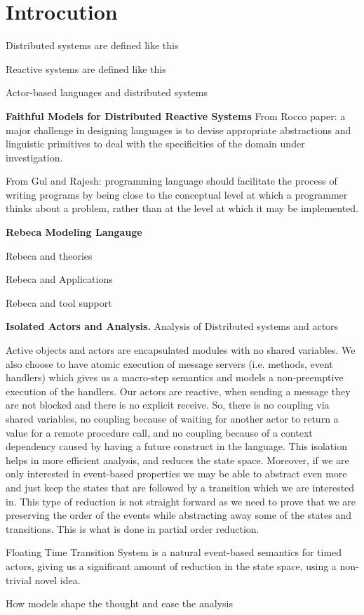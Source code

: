 \section{Introcution} \label{sec::introduction}



Distributed systems  are defined like this

Reactive systems are defined like this

Actor-based languages and distributed systems

\noindent\textbf{Faithful Models for Distributed Reactive Systems} %
From Rocco paper: a major challenge in designing languages is to devise appropriate abstractions and linguistic primitives to deal with the specificities of the domain under investigation.

From Gul and Rajesh: 
programming language should facilitate the process of writing programs by being close to the conceptual level at which a programmer thinks about a problem, rather than at the level at which it may be implemented. 

\noindent\textbf{Rebeca Modeling Langauge}

Rebeca and theories

Rebeca and Applications

Rebeca and tool support

\noindent\textbf{Isolated Actors and Analysis.}
Analysis of Distributed systems and actors

Active objects and actors are encapsulated modules with no shared variables. We also choose to have atomic execution of message servers (i.e. methods, event handlers) which gives us a macro-step semantics and models a non-preemptive execution of the handlers.
Our actors are reactive, when sending a message they are not blocked and there is no explicit receive. So, there is no coupling via shared variables, no coupling because of waiting for another actor to return a value for a remote procedure call, and no coupling because of a context dependency caused by having a future  construct in the language.
This isolation helps in more efficient analysis, and reduces the state space.
Moreover, if we are only interested in event-based properties we may be able to abstract even more and just keep the states that are followed by a transition which we are interested in. This type of reduction is not straight forward as we need to prove that we are preserving the order of the events while abstracting away some of the states and transitions. This is what is done in partial order reduction.

Floating Time Transition System is a natural event-based semantics for timed actors, giving us a significant amount of reduction in the state space, using a non-trivial novel idea.
	
How models shape the thought and ease the analysis